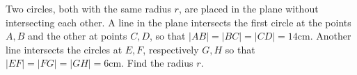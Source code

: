 Two circles, both with the same radius $r$,  are placed in the plane without intersecting each other. A line in the plane intersects the first circle at the points $A,B$ and the other at points $C,D$,  so that $|AB|=|BC|=|CD|=14\text{cm}$. Another line intersects the circles at $E,F$,  respectively $G,H$ so that $|EF|=|FG|=|GH|=6\text{cm}$. Find the radius $r$.